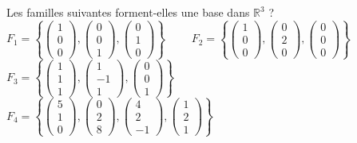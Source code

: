 \documentclass[12pt,a4paper]{report}
\begin{document}
Les familles suivantes forment-elles une base dans $\mathbb{R}^3$ ?\\[0.2cm]
\indent $F_1=\left\{\begin{pmatrix}1\\0\\0\end{pmatrix},\begin{pmatrix}0\\0\\1\end{pmatrix},\begin{pmatrix}0\\1\\0\end{pmatrix}\right\}$~~~~
 $F_2=\left\{	\begin{pmatrix}1\\0\\0\end{pmatrix},\begin{pmatrix}0\\2\\0\end{pmatrix},\begin{pmatrix}0\\0\\0\end{pmatrix}\right\}$~~~~
 $F_3=\left\{	\begin{pmatrix}1\\1\\1\end{pmatrix},\begin{pmatrix}1\\-1\\1\end{pmatrix},\begin{pmatrix}0\\0\\1\end{pmatrix}\right\}$\\[0.2cm]
\indent $F_4=\left\{	\begin{pmatrix}5\\1\\0\end{pmatrix},\begin{pmatrix}0\\2\\8\end{pmatrix},\begin{pmatrix}4\\2\\-1\end{pmatrix},\begin{pmatrix}1\\2\\1\end{pmatrix}\right\}$~~~~
\end{document}

